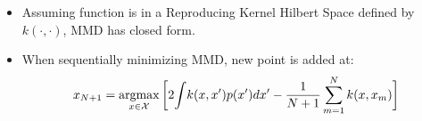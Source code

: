 \documentclass[usenames,dvipsnames]{beamer}
\begin{document}
\begin{frame}[plain, t]
	\titlebodyskip
	\slidebody
	{
	\begin{itemize}
\item 		Assuming function is in a Reproducing Kernel Hilbert Space defined by $k(\cdot , \cdot)$, MMD has closed form.
		

\pause

\item When sequentially minimizing MMD, new point is added at:
\begin{align*}
x_{N+1} = \argmax_{\vx \in \mathcal{X}} \bigg[ 2 \! \int \! k(\vx, \vx') p(x') dx' \nonumber - \frac{1}{N+1}\sum_{m=1}^{N} k(\vx,\vx_m) \bigg]\\
\end{align*}
\end{itemize}
	}
\end{frame}
\end{document}
